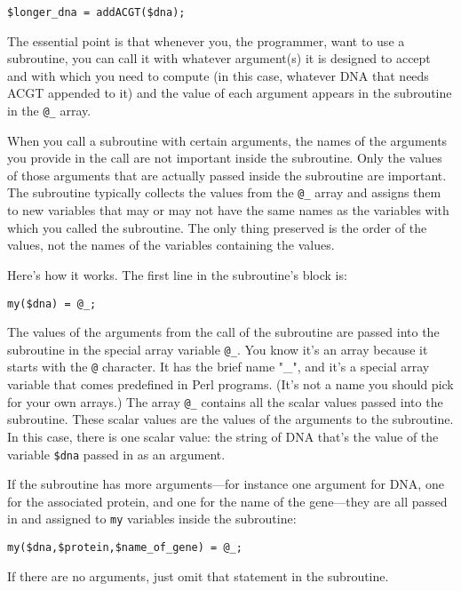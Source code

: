 \begin{lstlisting}
$longer_dna = addACGT($dna);
\end{lstlisting}

The essential point is that whenever you, the programmer, want to use a subroutine, you can call it with whatever argument(s) it is designed to accept and with which you need to compute (in this case, whatever DNA that needs ACGT appended to it) and the value of each argument appears in the subroutine in the \verb|@_| array.

When you call a subroutine with certain arguments, the names of the arguments you provide in the call are not important inside the subroutine. Only the values of those arguments that are actually passed inside the subroutine are important. The subroutine typically collects the values from the \verb|@_| array and assigns them to new variables that may or may not have the same names as the variables with which you called the subroutine. The only thing preserved is the order of the values, not the names of the variables containing the values.

Here's how it works. The first line in the subroutine's block is:

\begin{lstlisting}
my($dna) = @_; 
\end{lstlisting}

The values of the arguments from the call of the subroutine are passed into the subroutine in the special array variable \verb|@_|. You know it's an array because it starts with the \verb|@| character. It has the brief name "\_", and it's a special array variable that comes predefined in Perl programs. (It's not a name you should pick for your own arrays.) The array \verb|@_| contains all the scalar values passed into the subroutine.  These scalar values are the values of the arguments to the subroutine.  In this case, there is one scalar value: the string of DNA that's the value of the variable \verb|$dna| passed in as an argument.

If the subroutine has more arguments—for instance one argument for DNA, one for the associated protein, and one for the name of the gene—they are all passed in and assigned to \verb|my| variables inside the subroutine:

\begin{lstlisting}
my($dna,$protein,$name_of_gene) = @_;
\end{lstlisting}

If there are no arguments, just omit that statement in the subroutine.

